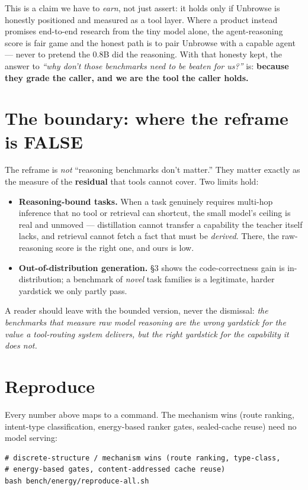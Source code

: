 \documentclass[11pt]{article}
\begin{document}
This is a claim we have to \emph{earn}, not just assert: it holds only if Unbrowse is
honestly positioned and measured as a tool layer. Where a product instead promises
end-to-end research from the tiny model alone, the agent-reasoning score is fair game
and the honest path is to pair Unbrowse with a capable agent --- never to pretend the
0.8B did the reasoning. With that honesty kept, the answer to \emph{``why don't those
benchmarks need to be beaten for us?''} is: \textbf{because they grade the caller, and
we are the tool the caller holds.}

\section{The boundary: where the reframe is FALSE}
The reframe is \emph{not} ``reasoning benchmarks don't matter.'' They matter exactly
as the measure of the \textbf{residual} that tools cannot cover. Two limits hold:
\begin{itemize}[leftmargin=1.8em]
  \item \textbf{Reasoning-bound tasks.} When a task genuinely requires multi-hop
  inference that no tool or retrieval can shortcut, the small model's ceiling is real
  and unmoved --- distillation cannot transfer a capability the teacher itself lacks,
  and retrieval cannot fetch a fact that must be \emph{derived}. There, the
  raw-reasoning score is the right one, and ours is low.
  \item \textbf{Out-of-distribution generation.} \S3 shows the code-correctness gain
  is in-distribution; a benchmark of \emph{novel} task families is a legitimate,
  harder yardstick we only partly pass.
\end{itemize}

A reader should leave with the bounded version, never the dismissal: \emph{the
benchmarks that measure raw model reasoning are the wrong yardstick for the value a
tool-routing system delivers, but the right yardstick for the capability it does
not.}

\section{Reproduce}
Every number above maps to a command. The mechanism wins (route ranking, intent-type
classification, energy-based ranker gates, sealed-cache reuse) need no model serving:

\begin{verbatim}
# discrete-structure / mechanism wins (route ranking, type-class,
# energy-based gates, content-addressed cache reuse)
bash bench/energy/reproduce-all.sh
\end{verbatim}
\end{document}
